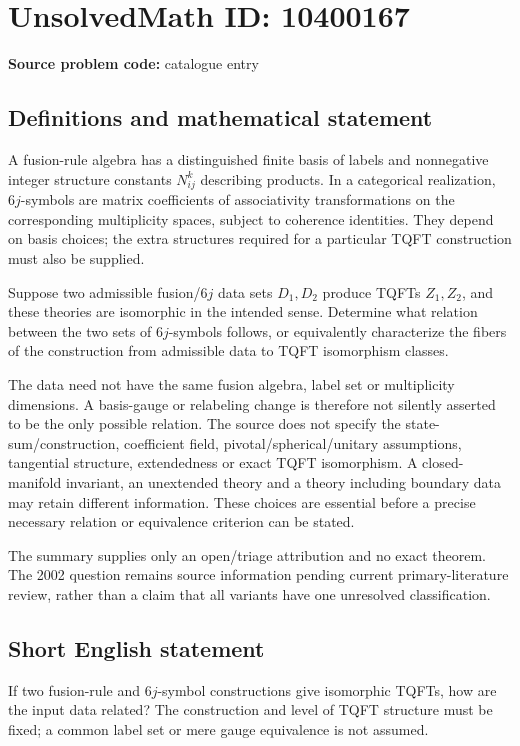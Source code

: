 \documentclass[11pt]{article}
\begin{document}
\section*{UnsolvedMath ID: 10400167}
\textbf{Source problem code:} catalogue entry
\subsection{Definitions and mathematical statement}
A fusion-rule algebra has a distinguished finite basis of labels and nonnegative integer structure constants \(N_{ij}^k\) describing products. In a categorical realization, \(6j\)-symbols are matrix coefficients of associativity transformations on the corresponding multiplicity spaces, subject to coherence identities. They depend on basis choices; the extra structures required for a particular TQFT construction must also be supplied.

Suppose two admissible fusion/\(6j\) data sets \(D_1,D_2\) produce TQFTs \(Z_1,Z_2\), and these theories are isomorphic in the intended sense. Determine what relation between the two sets of \(6j\)-symbols follows, or equivalently characterize the fibers of the construction from admissible data to TQFT isomorphism classes.

The data need not have the same fusion algebra, label set or multiplicity dimensions. A basis-gauge or relabeling change is therefore not silently asserted to be the only possible relation. The source does not specify the state-sum/construction, coefficient field, pivotal/spherical/unitary assumptions, tangential structure, extendedness or exact TQFT isomorphism. A closed-manifold invariant, an unextended theory and a theory including boundary data may retain different information. These choices are essential before a precise necessary relation or equivalence criterion can be stated.

The summary supplies only an open/triage attribution and no exact theorem. The 2002 question remains source information pending current primary-literature review, rather than a claim that all variants have one unresolved classification.
\subsection{Short English statement}
If two fusion-rule and \(6j\)-symbol constructions give isomorphic TQFTs, how are the input data related? The construction and level of TQFT structure must be fixed; a common label set or mere gauge equivalence is not assumed.
\end{document}
